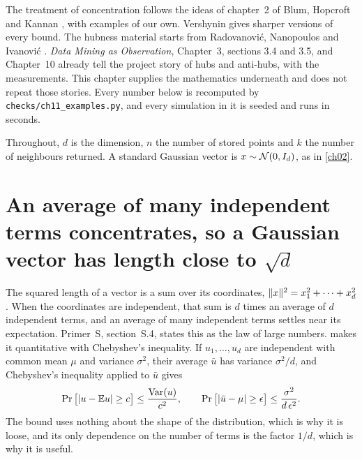 The treatment of concentration follows the ideas of chapter~2 of Blum, Hopcroft and Kannan \cite{blum2020}, with examples of our own. Vershynin \cite{vershynin2018} gives sharper versions of every bound. The hubness material starts from Radovanovi\'c, Nanopoulos and Ivanovi\'c \cite{radovanovic2010}. \emph{Data Mining as Observation}, Chapter~3, sections 3.4 and 3.5, and Chapter~10 already tell the project story of hubs and anti-hubs, with the measurements. This chapter supplies the mathematics underneath and does not repeat those stories. Every number below is recomputed by \texttt{checks/ch11\_examples.py}, and every simulation in it is seeded and runs in seconds.

Throughout, $d$ is the dimension, $n$ the number of stored points and $k$ the number of neighbours returned. A standard Gaussian vector is $x\sim\mathcal{N}(0,I_d)$, as in \cref{ch02}.

\section{An average of many independent terms concentrates, so a Gaussian vector has length close to \texorpdfstring{$\sqrt d$}{sqrt d}}\label{sec:ch11:norm}

The squared length of a vector is a sum over its coordinates, $\lVert x\rVert^2=x_1^2+\dots+x_d^2$. When the coordinates are independent, that sum is $d$ times an average of $d$ independent terms, and an average of many independent terms settles near its expectation. Primer~S, section~S.4, states this as the law of large numbers.  makes it quantitative with Chebyshev's inequality. If $u_1,\dots,u_d$ are independent with common mean $\mu$ and variance $\sigma^2$, their average $\bar u$ has variance $\sigma^2/d$, and Chebyshev's inequality applied to $\bar u$ gives
\begin{equation}\label{eq:ch11:lln}
\Pr\big[\lvert u-\mathbb{E} u\rvert\ge c\big]\le\frac{\operatorname{Var}(u)}{c^2},\qquad
\Pr\big[\lvert \bar u-\mu\rvert\ge\epsilon\big]\le\frac{\sigma^2}{d\,\epsilon^2}.
\end{equation}
The bound uses nothing about the shape of the distribution, which is why it is loose, and its only dependence on the number of terms is the factor $1/d$, which is why it is useful.

